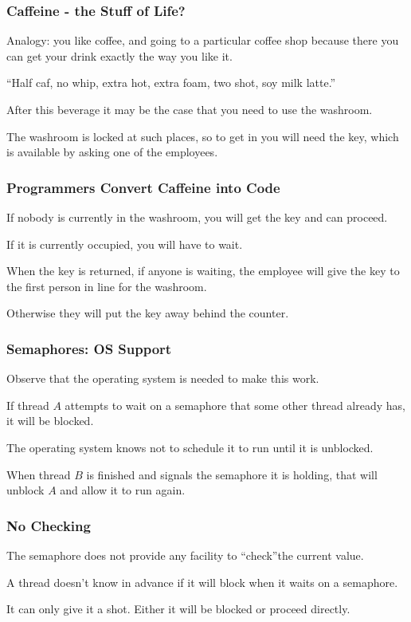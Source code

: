 \begin{frame}
\frametitle{Caffeine - the Stuff of Life?}

Analogy: you like coffee, and going to a particular coffee shop because there you can get your drink exactly the way you like it.

``Half caf, no whip, extra hot, extra foam, two shot, soy milk latte.''

After this beverage it may be the case that you need to use the washroom. 

The washroom is locked at such places, so to get in you will need the key, which is available by asking one of the employees. 

\end{frame}

\begin{frame}
\frametitle{Programmers Convert Caffeine into Code}

If nobody is currently in the washroom, you will get the key and can proceed. 

If it is currently occupied, you will have to wait. 

When the key is returned, if anyone is waiting, the employee will give the key to the first person in line for the washroom. 

Otherwise they will put the key away behind the counter.


\end{frame}

\begin{frame}
\frametitle{Semaphores: OS Support}

Observe that the operating system is needed to make this work. 

If thread $A$ attempts to wait on a semaphore that some other thread already has, it will be blocked. 

The operating system knows not to schedule it to run until it is unblocked. 

When thread $B$ is finished and signals the semaphore it is holding, that will unblock $A$ and allow it to run again.


\end{frame}

\begin{frame}
\frametitle{No Checking}


The semaphore does not provide any facility to ``check''the current value. 

A thread doesn't know in advance if it will block when it waits on a semaphore.

It can only give it a shot. Either it will be blocked or proceed directly.

\end{frame}

